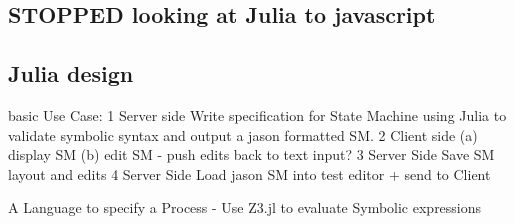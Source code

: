 \subsection{STOPPED looking at Julia to  javascript}
%
%
%

\subsection{Julia design}
basic Use Case:
1 Server side Write specification for State Machine using Julia to validate symbolic syntax and output a jason formatted SM.
2 Client side (a) display SM (b) edit SM - push edits back to text input?
3 Server Side Save SM layout and edits
4 Server Side Load jason SM into test editor + send to Client



A Language to specify  a Process - Use Z3.jl  to evaluate Symbolic expressions

